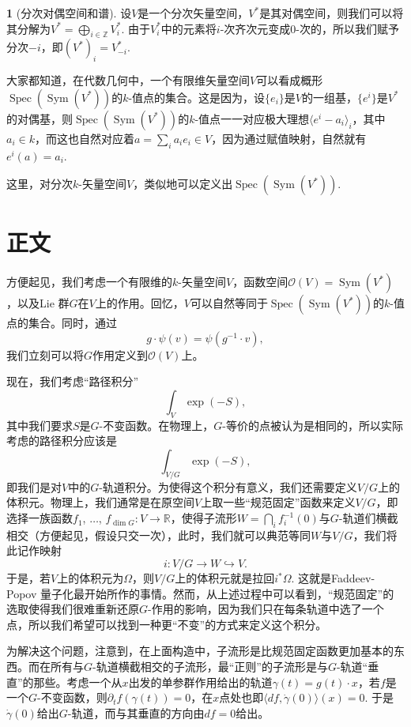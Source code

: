 \documentclass[12pt]{article}
\theoremstyle{definition}
\newtheorem{para}{}[section]
\theoremstyle{plain}
\begin{document}
\begin{para}[分次对偶空间和谱]
    设$V$是一个分次矢量空间，$V^*$是其对偶空间，则我们可以将其分解为$V^*=\bigoplus_{i\in\mathbb Z}V_i^*$. 由于$V_i^*$中的元素将$i$-次齐次元变成$0$-次的，所以我们赋予分次$-i$，即$(V^*)_i=V_{-i}^*$.

    大家都知道，在代数几何中，一个有限维矢量空间$V$可以看成概形$\operatorname{Spec}(\operatorname{Sym}(V^*))$的$k$-值点的集合。这是因为，设$\{e_i\}$是$V$的一组基，$\{e^i\}$是$V^*$的对偶基，则$\operatorname{Spec}(\operatorname{Sym}(V^*))$的$k$-值点一一对应极大理想$\langle e^i-a_i\rangle_i$，其中$a_i\in k$，而这也自然对应着$a=\sum_i a_ie_i\in V$，因为通过赋值映射，自然就有$e^i(a)=a_i$.

    这里，对分次$k$-矢量空间$V$，类似地可以定义出$\operatorname{Spec}(\operatorname{Sym}(V^*))$.
\end{para}

\section{正文}

方便起见，我们考虑一个有限维的$k$-矢量空间$V$，函数空间$\mathscr O(V)=\operatorname{Sym}(V^*)$，以及Lie 群$G$在$V$上的作用。回忆，$V$可以自然等同于$\operatorname{Spec}(\operatorname{Sym}(V^*))$的$k$-值点的集合。同时，通过
\[
g\cdot\psi(v)=\psi(g^{-1}\cdot v),
\]
我们立刻可以将$G$作用定义到$\mathscr O(V)$上。

现在，我们考虑“路径积分”
\[
\int_{V} \exp(-S),
\]
其中我们要求$S$是$G$-不变函数。在物理上，$G$-等价的点被认为是相同的，所以实际考虑的路径积分应该是
\[
\int_{V/G}\exp(-S),
\]
即我们是对$V$中的$G$-轨道积分。为使得这个积分有意义，我们还需要定义$V/G$上的体积元。物理上，我们通常是在原空间$V$上取一些“规范固定”函数来定义$V/G$，即选择一族函数$f_1$, $\dots$, $f_{\dim G}:V\to \mathbb R$，使得子流形$W=\bigcap_i f_i^{-1}(0)$与$G$-轨道们横截相交（方便起见，假设只交一次），此时，我们就可以典范等同$W$与$V/G$，我们将此记作映射
\[
    i:V/G\to W\hookrightarrow V.
\]
于是，若$V$上的体积元为$\Omega$，则$V/G$上的体积元就是拉回$i^*\Omega$. 这就是Faddeev-Popov 量子化最开始所作的事情。然而，从上述过程中可以看到，“规范固定”的选取使得我们很难重新还原$G$-作用的影响，因为我们只在每条轨道中选了一个点，所以我们希望可以找到一种更“不变”的方式来定义这个积分。

为解决这个问题，注意到，在上面构造中，子流形是比规范固定函数更加基本的东西。而在所有与$G$-轨道横截相交的子流形，最“正则”的子流形是与$G$-轨道“垂直”的那些。考虑一个从$x$出发的单参群作用给出的轨道$\gamma(t)=g(t)\cdot x$，若$f$是一个$G$-不变函数，则$\partial_t f(\gamma(t))=0$，在$x$点处也即$\langle df,\dot{\gamma}(0)\rangle(x)=0$. 于是$\dot \gamma(0)$给出$G$-轨道，而与其垂直的方向由$df=0$给出。
\end{document}
